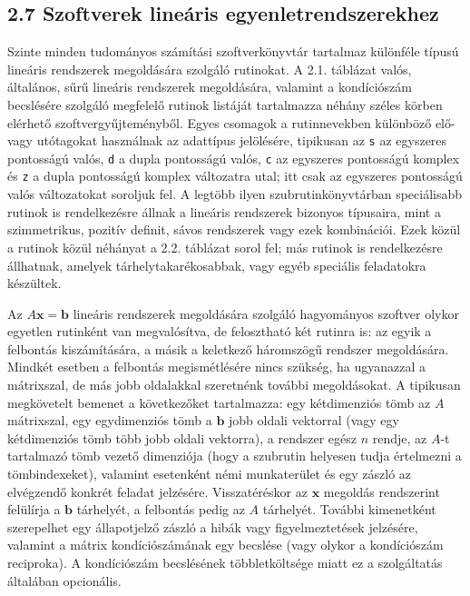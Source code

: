 \documentclass[
  magyar,
  11pt]{article}
\providecommand{\boldsymbol}[1]{\mathbf{#1}}
\begin{document}
\subsection{2.7 Szoftverek lineáris
egyenletrendszerekhez}\label{szoftverek-lineuxe1ris-egyenletrendszerekhez}

Szinte minden tudományos számítási szoftverkönyvtár tartalmaz különféle
típusú lineáris rendszerek megoldására szolgáló rutinokat. A 2.1.
táblázat valós, általános, sűrű lineáris rendszerek megoldására,
valamint a kondíciószám becslésére szolgáló megfelelő rutinok listáját
tartalmazza néhány széles körben elérhető szoftvergyűjteményből. Egyes
csomagok a rutinnevekben különböző elő- vagy utótagokat használnak az
adattípus jelölésére, tipikusan az \texttt{s} az egyszeres pontosságú
valós, \texttt{d} a dupla pontosságú valós, \texttt{c} az egyszeres
pontosságú komplex és \texttt{z} a dupla pontosságú komplex változatra
utal; itt csak az egyszeres pontosságú valós változatokat soroljuk fel.
A legtöbb ilyen szubrutinkönyvtárban speciálisabb rutinok is
rendelkezésre állnak a lineáris rendszerek bizonyos típusaira, mint a
szimmetrikus, pozitív definit, sávos rendszerek vagy ezek kombinációi.
Ezek közül a rutinok közül néhányat a 2.2. táblázat sorol fel; más
rutinok is rendelkezésre állhatnak, amelyek tárhelytakarékosabbak, vagy
egyéb speciális feladatokra készültek.

Az \(A\boldsymbol{x} = \boldsymbol{b}\) lineáris rendszerek megoldására
szolgáló hagyományos szoftver olykor egyetlen rutinként van
megvalósítva, de felosztható két rutinra is: az egyik a felbontás
kiszámítására, a másik a keletkező háromszögű rendszer megoldására.
Mindkét esetben a felbontás megismétlésére nincs szükség, ha ugyanazzal
a mátrixszal, de más jobb oldalakkal szeretnénk további megoldásokat. A
tipikusan megkövetelt bemenet a következőket tartalmazza: egy
kétdimenziós tömb az \(A\) mátrixszal, egy egydimenziós tömb a
\(\boldsymbol{b}\) jobb oldali vektorral (vagy egy kétdimenziós tömb
több jobb oldali vektorra), a rendszer egész \(n\) rendje, az \(A\)-t
tartalmazó tömb vezető dimenziója (hogy a szubrutin helyesen tudja
értelmezni a tömbindexeket), valamint esetenként némi munkaterület és
egy zászló az elvégzendő konkrét feladat jelzésére. Visszatéréskor az
\(\boldsymbol{x}\) megoldás rendszerint felülírja a \(\boldsymbol{b}\)
tárhelyét, a felbontás pedig az \(A\) tárhelyét. További kimenetként
szerepelhet egy állapotjelző zászló a hibák vagy figyelmeztetések
jelzésére, valamint a mátrix kondíciószámának egy becslése (vagy olykor
a kondíciószám reciproka). A kondíciószám becslésének többletköltsége
miatt ez a szolgáltatás általában opcionális.
\end{document}
